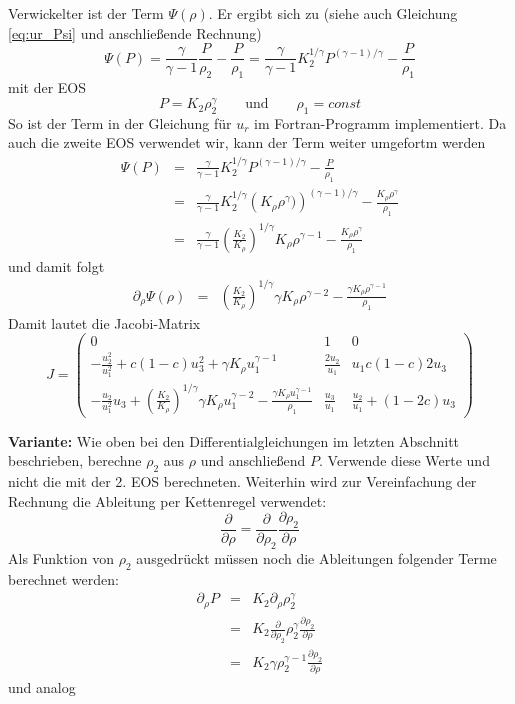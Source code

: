Verwickelter ist der Term $\Psi(\rho)$. Er ergibt sich zu (siehe auch Gleichung
\ref{eq:ur_Psi} und anschließende Rechnung)
\[
\Psi(P) = \frac{\gamma}{\gamma-1} \frac{P}{\rho_2} - \frac{P}{\rho_1}
= \frac{\gamma}{\gamma-1} K_2^{1/\gamma} P^{(\gamma-1)/\gamma} -
\frac{P}{\rho_1}
\]
mit der EOS
\[
P = K_2 \rho_2^\gamma  \qquad  \mbox{und} \qquad \rho_1=const
\]
So ist der Term in der Gleichung für $u_r$ im Fortran-Programm
implementiert. Da auch die zweite EOS verwendet wir, kann der Term
weiter umgefortm werden
\begin{eqnarray*}
  \Psi(P) &=& \frac{\gamma}{\gamma-1} K_2^{1/\gamma} P^{(\gamma-1)/\gamma} -
  \frac{P}{\rho_1}\\
  &=& \frac{\gamma}{\gamma-1} K_2^{1/\gamma} \left(K_\rho
  \rho^\gamma)\right)^{(\gamma-1)/\gamma} - \frac{K_\rho
  \rho^\gamma}{\rho_1}\\
  &=&\frac{\gamma}{\gamma-1}\left(\frac{K_2}{K_\rho}\right)^{1/\gamma}
  K_\rho\rho^{\gamma-1}
  - \frac{K_\rho \rho^\gamma}{\rho_1}
\end{eqnarray*}
und damit folgt
\begin{eqnarray*}
  \partial_{\rho} \Psi(\rho) &=& \left(\frac{K_2}{K_\rho}\right)^{1/\gamma}
\gamma K_\rho\rho^{\gamma-2} - \frac{\gamma K_\rho \rho^{\gamma-1}}{\rho_1} 
\end{eqnarray*}
Damit lautet die Jacobi-Matrix
\begin{equation}
J = \left(\begin{array}{ccc}
0 & 1 & 0\\[3mm]
- \frac{u_2^2}{u_1^2} + c (1-c) u_3^2  + \gamma K_\rho u_1^{\gamma-1}
& \frac{2 u_2}{u_1}  &  u_1 c (1-c) 2 u_3  \\[3mm]
- \frac{u_2}{u_1^2} u_3 +
\left(\frac{K_2}{K_\rho}\right)^{1/\gamma}
\gamma K_\rho u_1^{\gamma-2} - \frac{\gamma K_\rho u_1^{\gamma-1}}{\rho_1} 
&   \frac{u_3}{u_1}  &  
\frac{u_2}{u_1} + (1-2c) u_3 
\end{array}\right)\label{eq:jacobi_v1}
\end{equation}

{\bf Variante:} Wie oben bei den Differentialgleichungen im letzten
Abschnitt beschrieben, berechne $\rho_2$ aus $\rho$ und anschließend
$P$. Verwende diese Werte und nicht die mit der 2. EOS
berechneten. Weiterhin wird zur Vereinfachung der Rechnung die
Ableitung per Kettenregel verwendet:
\[
\frac{\partial}{\partial \rho} = \frac{\partial}{\partial \rho_2}
\frac{\partial\rho_2}{\partial \rho}
\]
Als Funktion von $\rho_2$ ausgedrückt müssen noch die
Ableitungen folgender Terme berechnet werden:
\begin{eqnarray*}
  \partial_{\rho} P &=&  K_2 \partial_{\rho}  \rho_2^\gamma\\  
  &=& K_2 \frac{\partial}{\partial \rho_2} \rho_2^\gamma
  \frac{\partial\rho_2}{\partial \rho}\\
  &=&  K_2 \gamma \rho_2^{\gamma-1} \frac{\partial\rho_2}{\partial \rho}
\end{eqnarray*}
und analog

